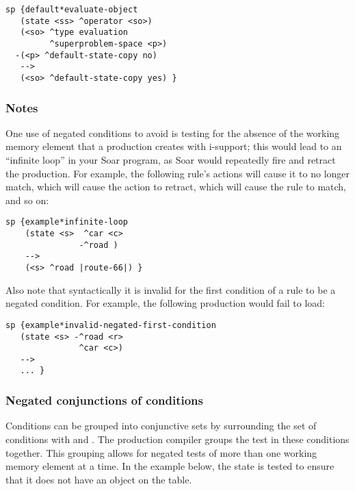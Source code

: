 \begin{verbatim}
sp {default*evaluate-object
   (state <ss> ^operator <so>)
   (<so> ^type evaluation 
         ^superproblem-space <p>)
  -(<p> ^default-state-copy no)
   -->
   (<so> ^default-state-copy yes) }
\end{verbatim}

\subsubsection*{Notes}

One use of negated conditions to avoid is testing for the absence of the working memory element that a production creates with i-support; this would lead to an ``infinite loop'' in your Soar program, as Soar would repeatedly fire and retract the production. For example, the following rule's actions will cause it to no longer match, which will cause the action to retract, which will cause the rule to match, and so on:

\begin{verbatim}
sp {example*infinite-loop
    (state <s>  ^car <c>
               -^road )
    -->
    (<s> ^road |route-66|) }
\end{verbatim}

Also note that syntactically it is invalid for the first condition of a rule to be a negated condition. For example, the following production would fail to load:

\begin{verbatim}
sp {example*invalid-negated-first-condition
   (state <s> -^road <r>
               ^car <c>)
   -->
   ... }
\end{verbatim}

\subsubsection{Negated conjunctions of conditions}
\label{SYNTAX-pm-lhs-negaconj}      %

Conditions can be grouped into conjunctive sets by surrounding the set of conditions with \soar{\{} and \soar{\}}. The production compiler groups the test in these conditions together. This grouping allows for negated tests of more than one working memory element at a time. In the example below, the state is tested to ensure that it does not have an object on the table. 

